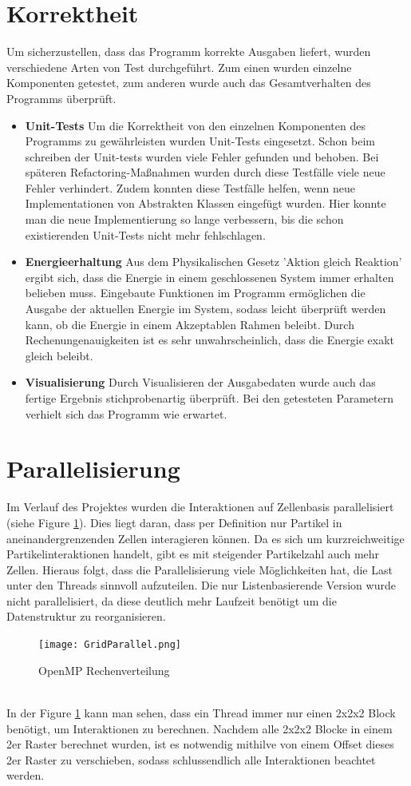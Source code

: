 \documentclass[
	12pt,
	a4paper,
	BCOR10mm,
	DIV14,
	headsepline,
]{scrreprt}
\begin{document}
\section{Korrektheit}
	Um sicherzustellen, dass das Programm korrekte Ausgaben liefert, wurden verschiedene Arten von Test durchgeführt. Zum einen wurden einzelne Komponenten getestet, zum anderen wurde auch das Gesamtverhalten des Programms überprüft.
	\begin{itemize}
		\item \textbf{Unit-Tests} Um die Korrektheit von den einzelnen Komponenten des Programms zu gewährleisten wurden Unit-Tests eingesetzt. Schon beim schreiben der Unit-tests wurden viele Fehler gefunden und behoben. Bei späteren Refactoring-Maßnahmen wurden durch diese Testfälle viele neue Fehler verhindert. Zudem konnten diese Testfälle helfen, wenn neue Implementationen von Abstrakten Klassen eingefügt wurden. Hier konnte man die neue Implementierung so lange verbessern, bis die schon existierenden Unit-Tests nicht mehr fehlschlagen.
		\item \textbf{Energieerhaltung} Aus dem Physikalischen Gesetz 'Aktion gleich Reaktion' ergibt sich, dass die Energie in einem geschlossenen System immer erhalten belieben muss. Eingebaute Funktionen im Programm ermöglichen die Ausgabe der aktuellen Energie im System, sodass leicht überprüft werden kann, ob die Energie in einem Akzeptablen Rahmen beleibt. Durch Rechenungenauigkeiten ist es sehr unwahrscheinlich, dass die Energie exakt gleich beleibt.
		\item \textbf{Visualisierung} Durch Visualisieren der Ausgabedaten wurde auch das fertige Ergebnis stichprobenartig überprüft. Bei den getesteten Parametern verhielt sich das Programm wie erwartet.
	\end{itemize}
\section{Parallelisierung}
	Im Verlauf des Projektes wurden die Interaktionen auf Zellenbasis parallelisiert (siehe Figure \ref{figure:OpenMPAufteilung}). Dies liegt daran, dass per Definition nur Partikel in aneinandergrenzenden Zellen interagieren können. Da es sich um kurzreichweitige Partikelinteraktionen handelt, gibt es mit steigender Partikelzahl auch mehr Zellen. Hieraus folgt, dass die Parallelisierung viele Möglichkeiten hat, die Last unter den Threads sinnvoll aufzuteilen. Die nur Listenbasierende Version wurde nicht parallelisiert, da diese deutlich mehr Laufzeit benötigt um die Datenstruktur zu reorganisieren. 
	\begin{figure}[h]
		\centering
		\texttt{[image: GridParallel.png]}
        \caption{OpenMP Rechenverteilung}
		\label{figure:OpenMPAufteilung}
	\end{figure}\\
    In der Figure \ref{figure:OpenMPAufteilung} kann man sehen, dass ein Thread immer nur einen 2x2x2 Block benötigt, um Interaktionen zu berechnen. Nachdem alle 2x2x2 Blocke in einem 2er Raster berechnet wurden, ist es notwendig mithilve von einem Offset dieses 2er Raster zu verschieben, sodass schlussendlich alle Interaktionen beachtet werden. 
    
\end{document}
